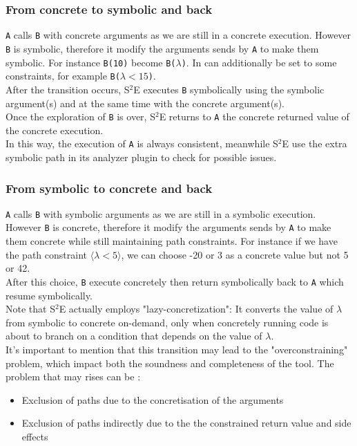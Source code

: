 \documentclass[11pt]{IEEEtran}
\begin{document}
    		\subsubsection*{From concrete to symbolic and back}
    			\texttt{A} calls \texttt{B} with concrete arguments as we are still in a concrete execution. However \texttt{B} is symbolic, therefore it modify the arguments sends by \texttt{A} to make them symbolic. For instance \texttt{B(10)} become \texttt{B($\lambda$)}. In can additionally be set to some constraints, for example \texttt{B($\lambda < 15$)}.\\
    			After the transition occurs, S$^2$E executes \texttt{B} symbolically using the symbolic argument(s) and at the same time with the concrete argument(s).\\
    			Once the exploration of \texttt{B} is over, S$^2$E returns to \texttt{A} the concrete returned value of the concrete execution.\\
    			In this way, the execution of \texttt{A} is always consistent, meanwhile S$^2$E use the extra symbolic path in its analyzer plugin to check for possible issues.

    		\subsubsection*{From symbolic to concrete and back}
    			\texttt{A} calls \texttt{B} with symbolic arguments as we are still in a symbolic execution. However \texttt{B} is concrete, therefore it modify the arguments sends by \texttt{A} to make them concrete while still maintaining path constraints. For instance if we have the path constraint  $\langle \lambda < 5 \rangle$, we can choose -20 or 3 as a concrete value but not 5 or 42.\\
    			After this choice, \texttt{B} execute concretely then return symbolically back to \texttt{A} which resume symbolically.\\

    			Note that S$^2$E actually employs "lazy-concretization": It converts the value of $\lambda$ from symbolic to concrete on-demand, only when concretely running code is about to branch on a condition that depends on the value of $\lambda$. \\

    			It's important to mention that this transition may lead to the "overconstraining" problem, which impact both the soundness and completeness of the tool. The problem that may rises can be :
    			\begin{itemize}
    				\item Exclusion of paths due to the concretisation of the arguments
    				\item Exclusion of paths indirectly due to the the constrained return value
and side effects
    			\end{itemize}
\end{document}
